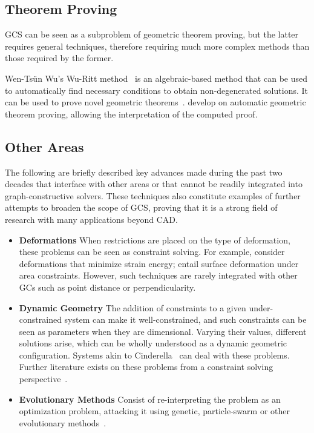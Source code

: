 \subsection{Theorem Proving}%
\label{sec:intro.constraints.proving}

\ac{GCS} can be seen as a subproblem of geometric theorem proving, but the
latter requires general techniques, therefore requiring much more complex
methods than those required by the former.

Wen-Tsün Wu's Wu-Ritt method~\cite{Wu:1984:BPMCTPG,Wu:1994:MTPG} is an
algebraic-based method that can be used to automatically find necessary
conditions to obtain non-degenerated solutions.  It can be used to prove novel
geometric theorems~\cite{Chou:1988:IWMMTPG}.
 develop on automatic geometric
theorem proving, allowing the interpretation of the computed proof.

\subsection{Other Areas}%
\label{sec:intro.constraints.other}

The following are briefly described key advances made during the past two
decades that interface with other areas or that cannot be readily integrated
into graph-constructive solvers.  These techniques also constitute examples of
further attempts to broaden the scope of \ac{GCS}, proving that it is a strong
field of research with many applications beyond \ac{CAD}.

\begin{itemize}
  \item[] \textbf{Deformations} When restrictions are placed on the type of
  deformation, these problems can be seen as constraint solving.  For
  example, \citet{Ahn:2014:GCQBCUML,Bao:2010:BIVCMSE,Moll:2006:PPDLO} consider
  deformations that minimize strain energy;  entail
  surface deformation under area constraints.  However, such techniques are
  rarely integrated with other \acp{GC} such as point distance or
  perpendicularity.
  \item[] \textbf{Dynamic Geometry} The addition of constraints to a given
  under-constrained system can make it well-constrained, and such constraints
  can be seen as parameters when they are dimensional.  Varying their values,
  different solutions arise, which can be wholly understood as a dynamic
  geometric configuration.  Systems akin to
  Cinderella~\cite{Richter:2012:Cinderella.2} can deal with these problems.
  Further literature exists on these problems from a constraint solving
  perspective~\cite{Freixas:2010:CDGS}.
  \item[] \textbf{Evolutionary Methods} Consist of re-interpreting the problem
  as an optimization problem, attacking it using genetic, particle-swarm or
  other evolutionary methods~\cite{Chunhong:2006:PDBOEA,Li:2012:HASPSOASGCP}.
\end{itemize}

